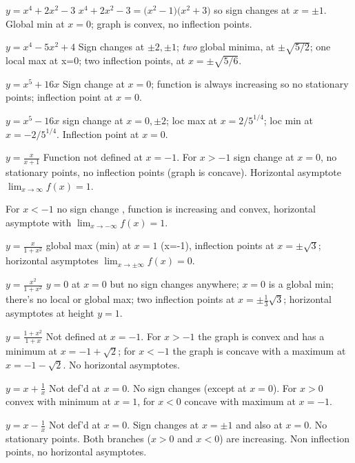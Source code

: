 \begin{multicols}{2}
\problem $\displaystyle y=x^4+2x^2-3 $
\answer
$x^4+2x^2-3 = \bigl(x^2-1\bigr)\bigl(x^2+3\bigr)$ so sign changes at
$x=\pm1$.  Global min at $x=0$;  graph is convex, no inflection points.
\endanswer

\problem $\displaystyle y=x^4-5x^2+4 $
\answer
Sign changes at $\pm2, \pm1$;  \emph{two} global minima, at $\pm\sqrt{5/2}$;
one local max at x=0;  two inflection points, at $x=\pm\sqrt{5/6}$.
\endanswer

\problem $\displaystyle y=x^5+16x$
\answer
Sign change at $x=0$;  function is always increasing so no stationary
points;  inflection point at $x=0$.
\endanswer

\problem $\displaystyle y=x^5-16x$
\answer
sign change at $x=0, \pm 2$;  loc max at $x=2/5^{1/4}$; loc min at
$x=-2/5^{1/4}$. Inflection point at $x=0$.
\endanswer

\problem $\displaystyle y=\frac{x} {x+1}$
\answer
Function not defined at $x=-1$.  For $x>-1$ sign change at $x=0$, no
stationary points, no inflection points (graph is concave).
Horizontal asymptote $\lim_{x\to \infty}f(x) = 1$.

For $x<-1$ no sign change , function is increasing and convex, horizontal
asymptote with $\lim_{x\to-\infty}f(x) = 1$.
\endanswer

\problem $\displaystyle y=\frac{x}{1+x^2}$
\answer
global max (min) at $x=1$ (x=-1), inflection points at $x=\pm\surd3$;
horizontal asymptotes $\lim_{x\to \pm\infty}f(x) = 0$.
\endanswer

\problem $\displaystyle y=\frac{x^2}{1+x^2}$
\answer
$y=0$ at $x=0$ but no sign changes anywhere;  $x=0$ is a global min;
there's no local or global max;  two inflection points at
$x=\pm\frac13\surd3$; horizontal asymptotes at height $y=1$.
\endanswer

\problem $\displaystyle y=\frac{1+x^2}{1+x}$
\answer
Not defined at $x=-1$.  For $x>-1$ the graph is convex and has a
minimum at $x=-1+\surd2$;  for $x<-1$ the graph is concave with a
maximum at $x=-1-\surd2$.  No horizontal asymptotes.
\endanswer

\problem $\displaystyle y=x+\frac1x$
\answer
Not def'd at $x=0$. No sign changes (except at $x=0$).
For $x>0$ convex with minimum at $x=1$, for $x<0$ concave
with maximum at $x=-1$.
\endanswer

\problem $\displaystyle y=x-\frac1x$
\answer
Not def'd at $x=0$. Sign changes at $x=\pm1$ and also at $x=0$.
No stationary points.  Both branches ($x>0$ and $x<0$) are
increasing.  Non inflection points, no horizontal asymptotes.
\endanswer


\end{multicols}
